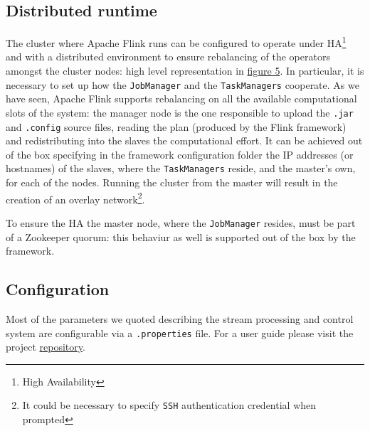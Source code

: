 \subsection{Distributed runtime}
The cluster where Apache Flink runs can be configured to operate under HA\footnote{High Availability} and with a distributed environment to ensure rebalancing of the operators amongst the cluster nodes: high level representation in \hyperref[fig:ember_ha]{figure 5}. 
In particular, it is necessary to set up how the \texttt{JobManager} and the \texttt{TaskManagers} cooperate. As we have seen, Apache Flink supports rebalancing on all the available computational slots of the system: the manager node is the one responsible to upload the \texttt{.jar} and \texttt{.config} source files, reading the plan (produced by the Flink framework) and redistributing into the slaves the computational effort. It can be achieved out of the box specifying in the framework configuration folder the IP addresses (or hostnames) of the slaves, where the \texttt{TaskManagers} reside, and the master's own, for each of the nodes. Running the cluster from the master will result in the creation of an overlay network\footnote{It could be necessary to specify \texttt{SSH} authentication credential when prompted}.

To ensure the HA the master node, where the \texttt{JobManager} resides, must be part of a Zookeeper quorum: this behaviur as well is supported out of the box by the framework.

\subsection{Configuration}
Most of the parameters we quoted describing the stream processing and control system are configurable via a \texttt{.properties} file. For a user guide please visit the project \href{https://github.com/projectember/project-ember}{repository}.

